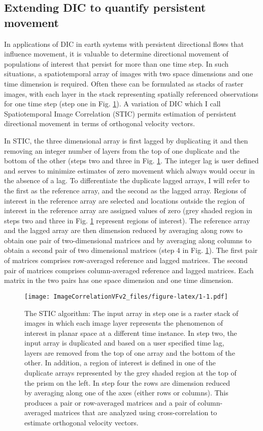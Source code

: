 \hypertarget{extending-dic-to-quantify-persistent-movement}{%
\subsection{Extending DIC to quantify persistent movement}\label{extending-dic-to-quantify-persistent-movement}}

In applications of DIC in earth systems with persistent directional flows that influence movement, it is valuable to determine directional movement of populations of interest that persist for more than one time step. In such situations, a spatiotemporal array of images with two space dimensions and one time dimension is required. Often these can be formulated as stacks of raster images, with each layer in the stack representing spatially referenced observations for one time step (step one in Fig. \ref{fig:1}). A variation of DIC which I call Spatiotemporal Image Correlation (STIC) permits estimation of persistent directional movement in terms of orthogonal velocity vectors.

In STIC, the three dimensional array is first lagged by duplicating it and then removing an integer number of layers from the top of one duplicate and the bottom of the other (steps two and three in Fig. \ref{fig:1}. The integer lag is user defined and serves to minimize estimates of zero movement which always would occur in the absence of a lag. To differentiate the duplicate lagged arrays, I will refer to the first as the reference array, and the second as the lagged array. Regions of interest in the reference array are selected and locations outside the region of interest in the reference array are assigned values of zero (grey shaded region in steps two and three in Fig. \ref{fig:1} represent regions of interest). The reference array and the lagged array are then dimension reduced by averaging along rows to obtain one pair of two-dimensional matrices and by averaging along columns to obtain a second pair of two dimensional matrices (step 4 in Fig. \ref{fig:1}). The first pair of matrices comprises row-averaged reference and lagged matrices. The second pair of matrices comprises column-averaged reference and lagged matrices. Each matrix in the two pairs has one space dimension and one time dimension.

\begin{figure}
\centering
\texttt{[image: ImageCorrelationVFv2\_files/figure-latex/1-1.pdf]}
\caption{\label{fig:1}The STIC algorithm: The input array in step one is a raster stack of images in which each image layer represents the phenomenon of interest in planar space at a different time instance. In step two, the input array is duplicated and based on a user specified time lag, layers are removed from the top of one array and the bottom of the other. In addition, a region of interest is defined in one of the duplicate arrays represented by the grey shaded region at the top of the prism on the left. In step four the rows are dimension reduced by averaging along one of the axes (either rows or columns). This produces a pair or row-averaged matrices and a pair of column-averaged matrices that are analyzed using cross-correlation to estimate orthogonal velocity vectors.}
\end{figure}

